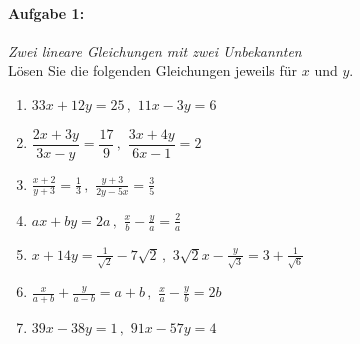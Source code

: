 
\paragraph{Aufgabe 1: } \emph{Zwei lineare Gleichungen mit zwei Unbekannten}\\[0.2cm]
Lösen Sie die folgenden Gleichungen jeweils für $x$ und $y$.
\begin{enumerate}[label=(\alph*)]
    \item $33x+12y=25\,,$ \tab $11x-3y=6$
    \item $\dfrac{2x+3y}{3x-y}=\dfrac{17}{9}\,, $ \tab $ \dfrac{3x+4y}{6x-1}=2$
    \item $\frac{x+2}{y+3}=\frac{1}{3}\,, $ \tab $ \frac{y+3}{2y-5x}=\frac{3}{5}$
    \item $ax+by=2a\,, $ \tab $ \frac{x}{b}-\frac{y}{a}=\frac{2}{a}$
    \item $x+14y=\frac{1}{\sqrt{2}}-7\sqrt{2}\,, $ \tab $ 3\sqrt{2}x-\frac{y}{\sqrt{3}}=3+\frac{1}{\sqrt{6}}$
    \item $\frac{x}{a+b}+\frac{y}{a-b}=a+b\,, $ \tab $ \frac{x}{a}-\frac{y}{b}=2b$
    \item $39x-38y=1\,, $ \tab $ 91x-57y=4$
\end{enumerate}

